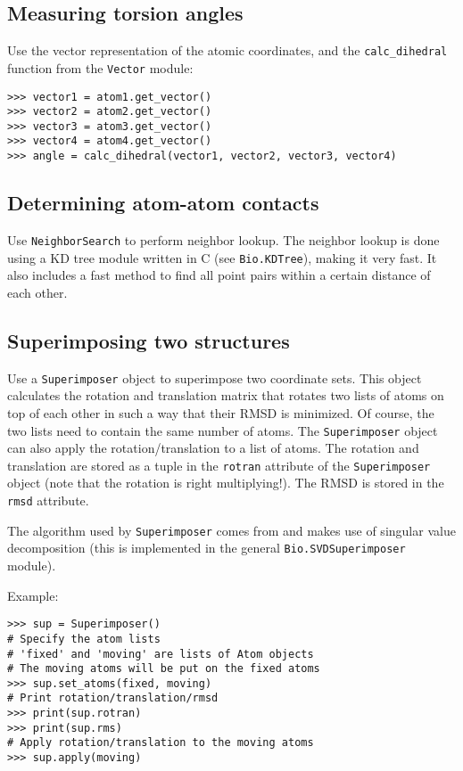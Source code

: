 \subsection{Measuring torsion angles}
Use  the vector representation of the atomic coordinates, and
the \texttt{calc\_dihedral} function from the \texttt{Vector} module:
\begin{verbatim}
>>> vector1 = atom1.get_vector()
>>> vector2 = atom2.get_vector()
>>> vector3 = atom3.get_vector()
>>> vector4 = atom4.get_vector()
>>> angle = calc_dihedral(vector1, vector2, vector3, vector4)
\end{verbatim}

\subsection{Determining atom-atom contacts}

Use \texttt{NeighborSearch} to perform neighbor lookup.
The neighbor lookup is done using a KD tree module written in C (see \texttt{Bio.KDTree}), making it very fast.
It  also includes a fast method to find all point pairs within a certain distance of each other.

\subsection{Superimposing two structures}

Use a \texttt{Superimposer} object to superimpose two coordinate sets.
This object calculates the rotation and translation matrix that rotates
two lists of atoms on top of each other in such a way that their RMSD
is minimized. Of course, the two lists need to contain the same number
of atoms. The \texttt{Superimposer} object can also apply the rotation/translation
to a list of atoms. The rotation and translation are stored as a tuple
in the \texttt{rotran} attribute of the \texttt{Superimposer} object
(note that the rotation is right multiplying!). The RMSD is stored
in the \texttt{rmsd} attribute.

The algorithm used by \texttt{Superimposer} comes from \cite[Golub \& Van Loan]{golub1989} and makes use of singular value decomposition (this is implemented in the general \texttt{Bio.SVDSuperimposer} module).

Example:

\begin{verbatim}
>>> sup = Superimposer()
# Specify the atom lists
# 'fixed' and 'moving' are lists of Atom objects
# The moving atoms will be put on the fixed atoms
>>> sup.set_atoms(fixed, moving)
# Print rotation/translation/rmsd
>>> print(sup.rotran)
>>> print(sup.rms)
# Apply rotation/translation to the moving atoms
>>> sup.apply(moving)
\end{verbatim}


